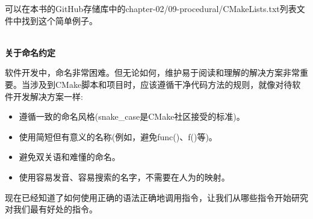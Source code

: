 可以在本书的GitHub存储库中的chapter-02/09-procedural/CMakeLists.txt列表文件中找到这个简单例子。

\hspace*{\fill} \\ %
\noindent
\textbf{关于命名约定}

软件开发中，命名非常困难。但无论如何，维护易于阅读和理解的解决方案非常重要。当涉及到CMake脚本和项目时，应该遵循干净代码方法的规则，就像对待软件开发解决方案一样:

\begin{itemize}
\item 
遵循一致的命名风格(snake\_case是CMake社区接受的标准)。

\item 
使用简短但有意义的名称(例如，避免func()、f()等)。

\item 
避免双关语和难懂的命名。

\item 
使用容易发音、容易搜索的名字，不需要在人为的映射。
\end{itemize}

现在已经知道了如何使用正确的语法正确地调用指令，让我们从哪些指令开始研究对我们最有好处的指令。
















